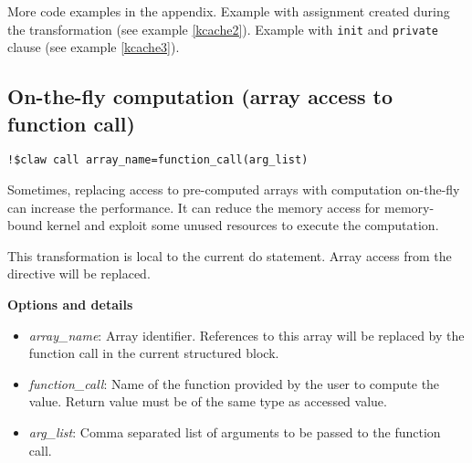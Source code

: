 More code examples in the appendix. Example with assignment created during the
transformation (see example \ref{kcache2}). Example with \lstinline!init! and
\lstinline!private! clause (see example \ref{kcache3}).

\subsection{On-the-fly computation (array access to function call)}
\begin{lstlisting}
!$claw call array_name=function_call(arg_list)
\end{lstlisting}

Sometimes, replacing access to pre-computed arrays with computation on-the-fly
can increase the performance. It can reduce the memory access for memory-bound
kernel and exploit some unused resources to execute the computation.

This transformation is local to the current do statement. Array access from the
directive will be replaced.

\textbf{Options and details}
\begin{itemize}
\item \textit{array\_name}: Array identifier. References to this array will be
replaced by the function call in the current structured block.
\item \textit{function\_call}: Name of the function provided by the user to
compute the value. Return value must be of the same type as accessed value.
\item \textit{arg\_list}: Comma separated list of arguments to be passed to
the function call.
\end{itemize}
